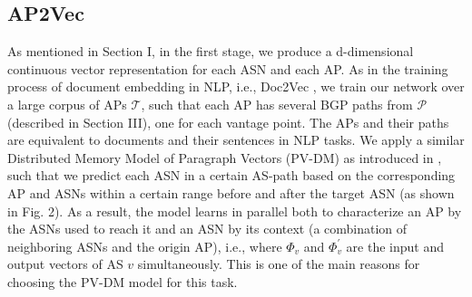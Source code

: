 \documentclass[10pt,journal]{IEEEtran}
\begin{document}
\subsection{AP2Vec}
As mentioned in Section I, in the first stage, we produce a d-dimensional continuous vector representation for each ASN and each AP. As in the training process of document embedding in NLP, i.e., Doc2Vec \cite{le2014distributed}, we train our network over a large corpus of APs $\mathcal{T}$, such that each AP has several BGP paths from $\mathcal{P}$ (described in Section III), one for each vantage point. The APs and their paths are equivalent to documents and their sentences in NLP tasks. We apply a similar Distributed Memory Model of Paragraph Vectors (PV-DM) as introduced in \cite{le2014distributed}, such that we predict each ASN in a certain AS-path based on the corresponding AP and ASNs within a certain range before and after the target ASN (as shown in Fig. 2). As a result, the model learns in parallel both to characterize an AP by the ASNs used to reach it and an ASN by its context (a combination of neighboring ASNs and the origin AP), i.e., where $\Phi_{v}$ and $\Phi_{v}^{\prime}$ are the input and output vectors of AS $v$ simultaneously. This is one of the main reasons for choosing the PV-DM model for this task.
\end{document}
